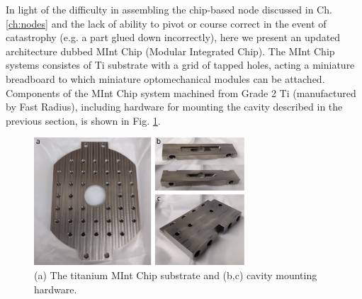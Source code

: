 In light of the difficulty in assembling the chip-based node discussed in Ch. \ref{ch:nodes} and the lack of ability to pivot or course correct in the event of catastrophy (e.g. a part glued down incorrectly), here we present an updated architecture dubbed MInt Chip (Modular Integrated Chip). The MInt Chip systems consistes of Ti substrate with a grid of tapped holes, acting a miniature breadboard to which miniature optomechanical modules can be attached. Components of the MInt Chip system machined from Grade 2 Ti (manufactured by Fast Radius), including hardware for mounting the cavity described in the previous section, is shown in Fig. \ref{fig:mintchip}.
\begin{figure}[htb]
    \centering
    \includegraphics[width=0.7\textwidth]{Images/mint_chip.pdf}
    \caption{(a) The titanium MInt Chip substrate and (b,c) cavity mounting hardware.}
    \label{fig:mintchip}
\end{figure}

